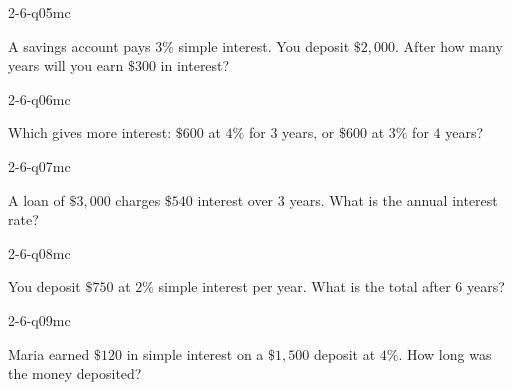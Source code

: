 \begin{practiceQuestion}{2-6-q05}{mc}
\begin{questionText}
A savings account pays $3\%$ simple interest. You deposit $\$2{,}000$. After how many years will you earn $\$300$ in interest?
\end{questionText}
\end{practiceQuestion}

\begin{practiceQuestion}{2-6-q06}{mc}
\begin{questionText}
Which gives more interest: $\$600$ at $4\%$ for $3$ years, or $\$600$ at $3\%$ for $4$ years?
\end{questionText}
\end{practiceQuestion}

\begin{practiceQuestion}{2-6-q07}{mc}
\begin{questionText}
A loan of $\$3{,}000$ charges $\$540$ interest over $3$ years. What is the annual interest rate?
\end{questionText}
\end{practiceQuestion}

\begin{practiceQuestion}{2-6-q08}{mc}
\begin{questionText}
You deposit $\$750$ at $2\%$ simple interest per year. What is the total after $6$ years?
\end{questionText}
\end{practiceQuestion}

\begin{practiceQuestion}{2-6-q09}{mc}
\begin{questionText}
Maria earned $\$120$ in simple interest on a $\$1{,}500$ deposit at $4\%$. How long was the money deposited?
\end{questionText}
\end{practiceQuestion}

